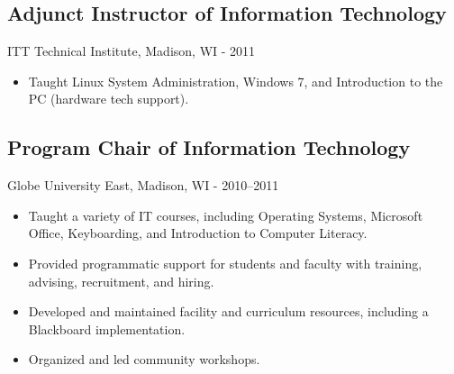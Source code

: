 \documentclass[../main.tex]{subfiles}
\begin{document}
	\subsection*{Adjunct Instructor of Information Technology}
     ITT Technical Institute, Madison, WI - 2011
	\begin{itemize}
		\item{Taught Linux System Administration, Windows 7, and Introduction to the PC (hardware tech support).}
	\end{itemize}

	\subsection*{Program Chair of Information Technology}
     Globe University East, Madison, WI - 2010--2011
	\begin{itemize}
		\item{Taught a variety of IT courses, including Operating Systems, Microsoft Office, Keyboarding, and Introduction to Computer Literacy.}
		\item{Provided programmatic support for students and faculty with training, advising, recruitment, and hiring.}
		\item{Developed and maintained facility and curriculum resources, including a Blackboard implementation.}
		\item{Organized and led community workshops.}
	\end{itemize}
\end{document}
